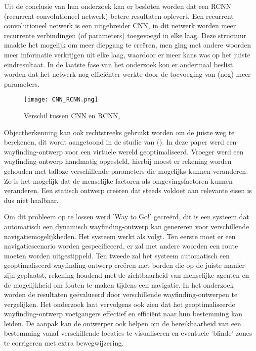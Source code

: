 Uit de conclusie van hun onderzoek kan er besloten worden dat een RCNN (recurrent convolutioneel netwerk) betere resultaten oplevert. Een recurrent convolutioneel netwerk is een uitgebreider CNN, in dit netwerk worden meer recurrente verbindingen (of parameters) toegevoegd in elke laag. Deze structuur maakte het mogelijk om meer diepgang te creëren, men ging met andere woorden meer informatie verkrijgen uit elke laag, waardoor er meer kans was op het juiste eindresultaat. In de laatste fase van het onderzoek kon er andermaal beslist worden dat het netwerk nog efficiënter werkte door de toevoeging van (nog) meer parameters.

\begin{figure}[H]
	\centering
	\texttt{[image: CNN\_RCNN.png]}
	\caption{Verschil tussen CNN en RCNN, \autocite{Liang2015}}
\end{figure}

Objectherkenning kan ook rechtstreeks gebruikt worden om de juiste weg te berekenen, dit wordt aangetoond in de studie van \textcite{Haikun2017} (). In deze paper werd een wayfinding-ontwerp voor een virtuele wereld geoptimaliseerd. Vroeger werd een wayfinding-ontwerp handmatig opgesteld, hierbij moest er rekening worden gehouden met talloze verschillende parameters die mogelijks kunnen veranderen. Zo is het mogelijk dat de menselijke factoren als omgevingsfactoren  kunnen veranderen. Een statisch ontwerp creëren dat steeds voldoet aan relevante eisen is dus niet haalbaar.

Om dit probleem op te lossen werd 'Way to Go!' gecreërd, dit is een systeem dat automatisch een dynamisch wayfinding-ontwerp kan genereren voor verschillende navigatiemogelijkheden. Het systeem werkt als volgt. Ten eerste moet er een navigatiescenario worden gespecificeerd, er zal  met andere woorden een route moeten worden uitgestippeld. Ten tweede zal het systeem automatisch een geoptimaliseerd wayfinding-ontwerp creëren met borden die op de juiste manier zijn geplaatst, rekening houdend met de zichtbaarheid van menselijke agenten en de mogelijkheid om fouten te maken tijdens een navigatie.  In het onderzoek worden de resultaten geëvalueerd door verschillende wayfinding-ontwerpen te vergelijken. Het onderzoek laat vervolgens ook zien dat het geoptimaliseerde wayfinding-ontwerp voetgangers effectief en efficiënt naar hun bestemming kan leiden. De aanpak kan de ontwerper ook helpen om de bereikbaarheid van een bestemming vanaf verschillende locaties te visualiseren en eventuele 'blinde' zones te corrigeren met extra bewegwijzering.

